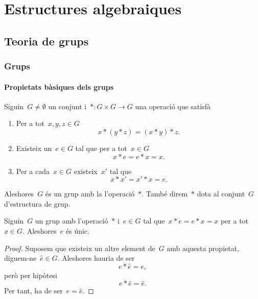 \documentclass[../../main.tex]{subfiles}
\begin{document}
\part{Estructures algebraiques}
\chapter{Teoria de grups}
\section{Grups}
    \subsection{Propietats bàsiques dels grups}
    \begin{definition}[Grup]
        \label{def:grup}
        Siguin~\(G\neq\emptyset\) un conjunt i~\(\ast\colon G\times G\to G\) una operació que satisfà
        \begin{enumerate}
            \item Per a tot~\(x,y,z\in G\)
            \[
                x\ast(y\ast z)=(x\ast y)\ast z.
            \]
            \item Existeix un~\(e\in G\) tal que per a tot~\(x\in G\)
            \[
                x\ast e=e\ast x=x.
            \]
            \item Per a cada~\(x\in G\) existeix~\(x'\) tal que
            \[
                x\ast x'=x'\ast x=e.
            \]
        \end{enumerate}
        Aleshores~\(G\) és un grup amb la l'operació~\(\ast\).
        També direm~\(\ast\) dota al conjunt~\(G\) d'estructura de grup.
    \end{definition}
    \begin{proposition}
        \label{prop:unicitat neutre del grup}
        Siguin~\(G\) un grup amb l'operació~\(\ast\) i~\(e\in G\) tal que~\(x\ast e=e\ast x=x\) per a tot~\(x\in G\).
        Aleshores~\(e\) és únic.
        \begin{proof}
            Suposem que existeix un altre element de~\(G\) amb aquesta propietat, diguem-ne~\(\hat{e}\in G\).
            Aleshores hauria de ser
            \[
                e\ast\hat{e}=e,
            \]
            però per hipòtesi
            \[
                e\ast\hat{e}=\hat{e}.
            \]
            Per tant, ha de ser~\(e=\hat{e}\).
        \end{proof}
    \end{proposition}
\end{document}
